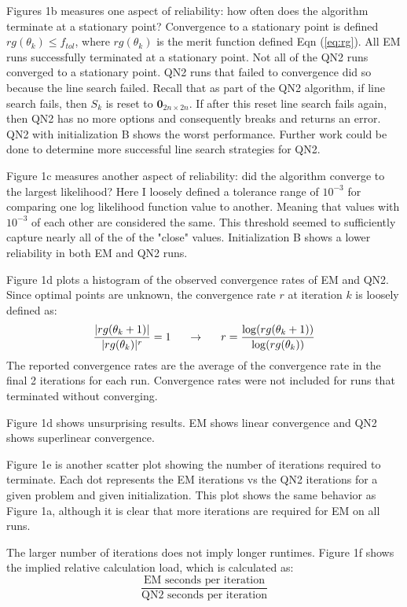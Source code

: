 \documentclass[letter,12pt]{article}
\begin{document}
Figures 1b measures one aspect of reliability: how often does the algorithm terminate at a stationary point?  Convergence to a stationary point is defined $rg(\theta_k) \leq f_{tol}$, where $rg(\theta_k)$ is the merit function defined Eqn (\ref{eq:rg}).  All EM runs successfully terminated at a stationary point.  Not all of the QN2 runs converged to a stationary point.  QN2 runs that failed to convergence did so because the line search failed.  Recall that as part of the QN2 algorithm, if line search fails, then $S_k$ is reset to $\boldsymbol{0}_{2n \times 2n}$.  If after this reset line search fails again, then QN2 has no more options and consequently breaks and returns an error.  QN2 with initialization B shows the worst performance.  Further work could be done to determine more successful line search strategies for QN2.

Figure 1c measures another aspect of reliability: did the algorithm converge to the largest likelihood?  Here I loosely defined a tolerance range of $10^{-3}$ for comparing one log likelihood function value to another.  Meaning that values with $10^{-3}$ of each other are considered the same.  This threshold seemed to sufficiently capture nearly all of the of the "close" values.  Initialization B shows a lower reliability in both EM and QN2 runs.

Figure 1d plots a histogram of the observed convergence rates of EM and QN2.  Since optimal points are unknown, the convergence rate $r$ at iteration $k$ is loosely defined as:
\[
\frac{|rg(\theta_k+1)|}{|rg(\theta_k)|^r} = 1
\indent
\rightarrow
\indent
r = \frac{\log(rg(\theta_k+1))}{\log(rg(\theta_k))}
\]
The reported convergence rates are the average of the convergence rate in the final 2 iterations for each run.  Convergence rates were not included for runs that terminated without converging.

Figure 1d shows unsurprising results.  EM shows linear convergence and QN2 shows superlinear convergence.

Figure 1e is another scatter plot showing the number of iterations required to terminate.  Each dot represents the EM iterations vs the QN2 iterations for a given problem and given initialization.  This plot shows the same behavior as Figure 1a, although it is clear that more iterations are required for EM on all runs.

The larger number of iterations does not imply longer runtimes.  Figure 1f shows the implied relative calculation load, which is calculated as:
\[
\frac{\text{EM seconds per iteration}}{\text{QN2 seconds per iteration}}
\]
\end{document}
